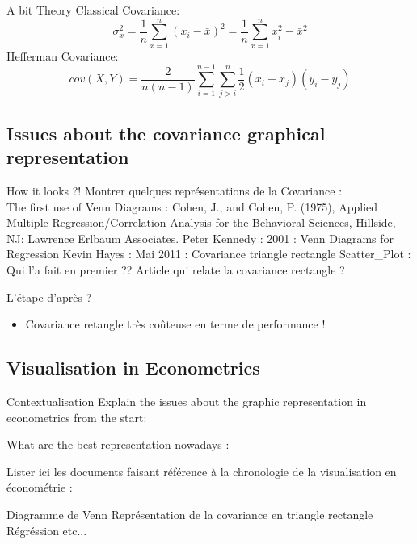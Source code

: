 \documentclass{beamer}
\begin{document}
\begin{frame}{A bit Theory}
Classical Covariance:
    \begin{equation}
        \sigma^2_x=\frac{1}{n}\sum_{x=1}^{n}(x_i - \bar{x})^2 = \frac{1}{n}\sum_{x=1}^{n}x_i^2 - \bar{x}^2 
    \end{equation}
Hefferman Covariance:
    \begin{equation}
        cov(X,Y)= \frac{2}{n(n-1)}\sum_{i=1}^{n-1}\sum_{j>i}^{n}\frac{1}{2}(x_i-x_j)(y_i - y_j)
    \end{equation}
\end{frame}

\subsection{Issues about the covariance graphical representation}
\begin{frame}{How it looks ?!}
Montrer quelques représentations de la Covariance : \\

The first use of Venn Diagrams : Cohen, J., and Cohen, P. (1975), Applied Multiple Regression/Correlation Analysis for the Behavioral Sciences, Hillside, NJ: Lawrence Erlbaum Associates.
Peter Kennedy : 2001 : Venn Diagrams for Regression
Kevin Hayes : Mai 2011 : Covariance triangle rectangle
Scatter_Plot : Qui l'a fait en premier ?? Article qui relate la covariance rectangle ?

L'étape d'après ? 
\begin{itemize}
    \item Covariance retangle très coûteuse en terme de performance ! 
\end{itemize}





\end{frame}

\subsection{}



\subsection{Visualisation in Econometrics}

\begin{frame}{Contextualisation}
Explain the issues about the graphic representation in econometrics from the start: 

What are the best representation nowadays :


\end{frame}

Lister ici les documents faisant référence à la chronologie de la visualisation en économétrie : 

Diagramme de Venn
Représentation de la covariance en triangle rectangle
Régréssion 
etc... 
\end{document}
